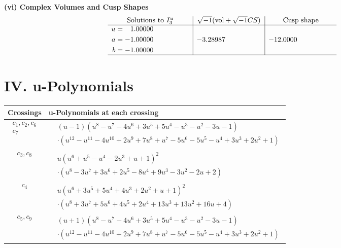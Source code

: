 \documentclass[1p]{elsarticle_modified}
\theoremstyle{definition}
\newcommand{\I}{\sqrt{-1}}
\begin{document}
\newpage\flushleft \textbf{(vi) Complex Volumes and Cusp Shapes}
$$\begin{array}{c|c|c}  
\text{Solutions to }I^u_{3}& \I (\text{vol} + \sqrt{-1}CS) & \text{Cusp shape}\\
 \hline 
\begin{aligned}
u &= \phantom{-}1.00000\phantom{ +0.000000I} \\
a &= -1.00000\phantom{ +0.000000I} \\
b &= -1.00000\phantom{ +0.000000I}\end{aligned}
 & -3.28987\phantom{ +0.000000I} & -12.0000\phantom{ +0.000000I}\\
 \hline 
 \end{array}$$\newpage
\newpage\renewcommand{\arraystretch}{1}
\centering \section*{ IV. u-Polynomials}
\begin{tabular}{m{50pt}|m{274pt}}
Crossings & \hspace{64pt}u-Polynomials at each crossing \\
\hline $$\begin{aligned}c_{1},c_{2},c_{6}\\c_{7}\end{aligned}$$&$\begin{aligned}
&(u-1)(u^8- u^7-4 u^6+3 u^5+5 u^4- u^3- u^2-3 u-1)\\
&\cdot(u^{12}- u^{11}-4 u^{10}+2 u^9+7 u^8+u^7-5 u^6-5 u^5- u^4+3 u^3+2 u^2+1)
\end{aligned}$\\
\hline $$\begin{aligned}c_{3},c_{8}\end{aligned}$$&$\begin{aligned}
&u(u^6+u^5- u^4-2 u^3+u+1)^2\\
&\cdot(u^8-3 u^7+3 u^6+2 u^5-8 u^4+9 u^3-3 u^2-2 u+2)
\end{aligned}$\\
\hline $$\begin{aligned}c_{4}\end{aligned}$$&$\begin{aligned}
&u(u^6+3 u^5+5 u^4+4 u^3+2 u^2+u+1)^2\\
&\cdot(u^8+3 u^7+5 u^6+4 u^5+2 u^4+13 u^3+13 u^2+16 u+4)
\end{aligned}$\\
\hline $$\begin{aligned}c_{5},c_{9}\end{aligned}$$&$\begin{aligned}
&(u+1)(u^8- u^7-4 u^6+3 u^5+5 u^4- u^3- u^2-3 u-1)\\
&\cdot(u^{12}- u^{11}-4 u^{10}+2 u^9+7 u^8+u^7-5 u^6-5 u^5- u^4+3 u^3+2 u^2+1)
\end{aligned}$\\
\hline
\end{tabular}\newpage\renewcommand{\arraystretch}{1}
\end{document}
